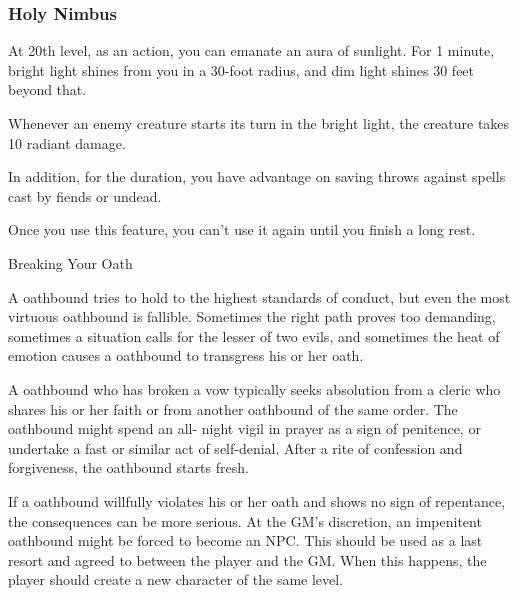 \subsubsection{Holy Nimbus}

At 20th level, as an action, you can emanate an aura of sunlight. For 1 minute, bright light shines from you in a 30-foot radius, and dim light shines 30 feet beyond that.

Whenever an enemy creature starts its turn in the bright light, the creature takes 10 radiant damage.

In addition, for the duration, you have advantage on saving throws against spells cast by fiends or undead.

Once you use this feature, you can't use it again until you finish a long rest.

\begin{DndComment}{Breaking Your Oath}

A oathbound tries to hold to the highest standards of conduct, but even the most virtuous oathbound is fallible. Sometimes the right path proves too demanding, sometimes a situation calls for the lesser of two evils, and sometimes the heat of emotion causes a oathbound to transgress his or her oath.

A oathbound who has broken a vow typically seeks absolution from a cleric who shares his or her faith or from another oathbound of the same order. The oathbound might spend an all- night vigil in prayer as a sign of penitence, or undertake a fast or similar act of self-denial. After a rite of confession and forgiveness, the oathbound starts fresh.

If a oathbound willfully violates his or her oath and shows no sign of repentance, the consequences can be more serious. At the GM's discretion, an impenitent oathbound might be forced to become an NPC. This should be used as a last resort and agreed to between the player and the GM. When this happens, the player should create a new character of the same level.
\end{DndComment}

